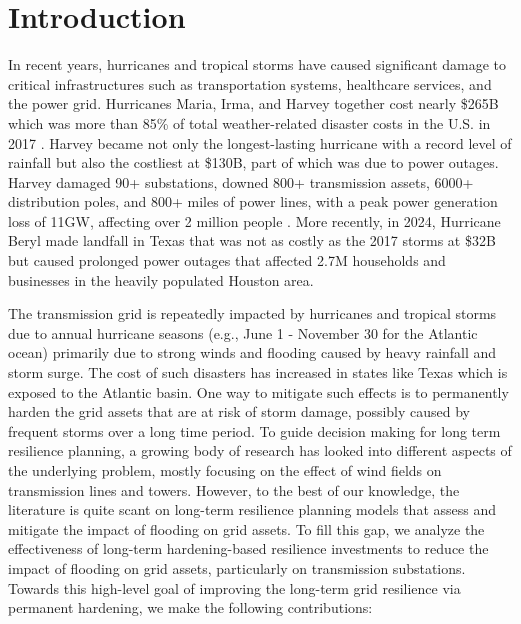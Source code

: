 \documentclass[authoryear,preprint,review,12pt]{elsarticle}\usepackage{amssymb}
\begin{document}
\section{Introduction}
In recent years, hurricanes and tropical storms have caused significant damage to critical infrastructures such as transportation systems, healthcare services, and the power grid. Hurricanes Maria, Irma, and Harvey together cost nearly \$265B which was more than 85\% of total weather-related disaster costs in the U.S. in 2017 \cite{billion_nerc}. Harvey became not only the longest-lasting hurricane with a record level of rainfall but also the costliest at \$130B, part of which was due to power outages. Harvey damaged 90+ substations, downed 800+ transmission assets, 6000+ distribution poles, and 800+ miles of power lines, with a peak power generation loss of 11GW, affecting over 2 million people \cite{NERC2018}. More recently, in 2024, Hurricane Beryl made landfall in Texas that was not as costly as the 2017 storms at \$32B but caused prolonged power outages that affected 2.7M households and businesses in the heavily populated Houston area. 

The transmission grid is repeatedly impacted by hurricanes and tropical storms due to annual hurricane seasons (e.g., June 1 - November 30 for the Atlantic ocean) primarily due to strong winds and flooding caused by heavy rainfall and storm surge. The cost of such disasters has increased in states like Texas which is exposed to the Atlantic basin. One way to mitigate such effects is to permanently harden the grid assets that are at risk of storm damage, possibly caused by frequent storms over a long time period. To guide decision making for long term resilience planning, a growing body of research has looked into different aspects of the underlying problem, mostly focusing on the effect of wind fields on transmission lines and towers. However, to the best of our knowledge, the literature is quite scant on long-term resilience planning models that assess and mitigate the impact of flooding on grid assets. To fill this gap, we analyze the effectiveness of long-term hardening-based resilience investments to reduce the impact of flooding on grid assets, particularly on transmission substations. Towards this high-level goal of improving the long-term grid resilience via permanent hardening, we make the following contributions:
\end{document}
